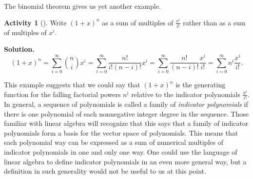 \documentclass[10pt,]{book}
\theoremstyle{plain}
\theoremstyle{definition}
\newtheorem{activity}[project]{Activity}
\numberwithin{equation}{chapter}
\begin{document}
\par
The binomial theorem gives us yet another example.%
\begin{activity}[]\label{activity-350}
Write \((1+x)^n\) as a sum of multiples of \(\frac{x^i}{i!}\) rather than as a sum of multiples of \(x^i\).%
\par\medskip\noindent%
\textbf{Solution.}\quad %
\begin{equation*}
(1+x)^n =
\sum_{i=0}^\infty \binom{n}{i}x^i=\sum_{i=0}^\infty \frac{n!}{i!(n-i)!}x^i
=
\sum_{i=0}^\infty \frac{n!}{(n-i)!}\frac{x^i}{i!} = \sum_{i=0}^\infty
n^{\underline{i}} \frac{x^i}{i!}.
\end{equation*}
\end{activity}
This example suggests that we could say that \((1+x)^n\) is the generating function for the falling factorial powers \(n^{\underline{i}}\) relative to the indicator polynomials \(\frac{x^i}{i!}\). In general, a sequence of polynomials is called a family of \emph{indicator polynomials} if there is one polynomial of each nonnegative integer degree in the sequence. Those familiar with linear algebra will recognize that this says that a family of indicator polynomials form a basis for the vector space of polynomials. This means that each polynomial way can be expressed as a sum of numerical multiples of indicator polynomials in one and only one way. One could use the language of linear algebra to define indicator polynomials in an even more general way, but a definition in such generality would not be useful to us at this point.%
\typeout{************************************************}
\typeout{************************************************}
\end{document}
